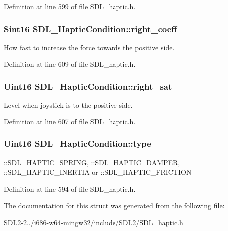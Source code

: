 Definition at line 599 of file S\+D\+L\+\_\+haptic.\+h.

\hypertarget{structSDL__HapticCondition_a8fd18ffa42b1a34a28759657eac21e45}{
\subsubsection[{right\+\_\+coeff}]{\setlength{\rightskip}{0pt plus 5cm}Sint16 S\+D\+L\+\_\+\+Haptic\+Condition\+::right\+\_\+coeff}}\label{structSDL__HapticCondition_a8fd18ffa42b1a34a28759657eac21e45}
How fast to increase the force towards the positive side. 

Definition at line 609 of file S\+D\+L\+\_\+haptic.\+h.

\hypertarget{structSDL__HapticCondition_ae60f900dda3063e1b63be77b154148b7}{
\subsubsection[{right\+\_\+sat}]{\setlength{\rightskip}{0pt plus 5cm}Uint16 S\+D\+L\+\_\+\+Haptic\+Condition\+::right\+\_\+sat}}\label{structSDL__HapticCondition_ae60f900dda3063e1b63be77b154148b7}
Level when joystick is to the positive side. 

Definition at line 607 of file S\+D\+L\+\_\+haptic.\+h.

\hypertarget{structSDL__HapticCondition_a7be55a9a86c05dd1a54a3006781cfa6f}{
\subsubsection[{type}]{\setlength{\rightskip}{0pt plus 5cm}Uint16 S\+D\+L\+\_\+\+Haptic\+Condition\+::type}}\label{structSDL__HapticCondition_a7be55a9a86c05dd1a54a3006781cfa6f}
\+::\+S\+D\+L\+\_\+\+H\+A\+P\+T\+I\+C\+\_\+\+S\+P\+R\+I\+N\+G, \+::\+S\+D\+L\+\_\+\+H\+A\+P\+T\+I\+C\+\_\+\+D\+A\+M\+P\+E\+R, \+::\+S\+D\+L\+\_\+\+H\+A\+P\+T\+I\+C\+\_\+\+I\+N\+E\+R\+T\+I\+A or \+::\+S\+D\+L\+\_\+\+H\+A\+P\+T\+I\+C\+\_\+\+F\+R\+I\+C\+T\+I\+O\+N 

Definition at line 594 of file S\+D\+L\+\_\+haptic.\+h.



The documentation for this struct was generated from the following file\+:\begin{DoxyCompactItemize}
\item 
S\+D\+L2-\/2../i686-\/w64-\/mingw32/include/\+S\+D\+L2/S\+D\+L\+\_\+haptic.\+h\end{DoxyCompactItemize}
